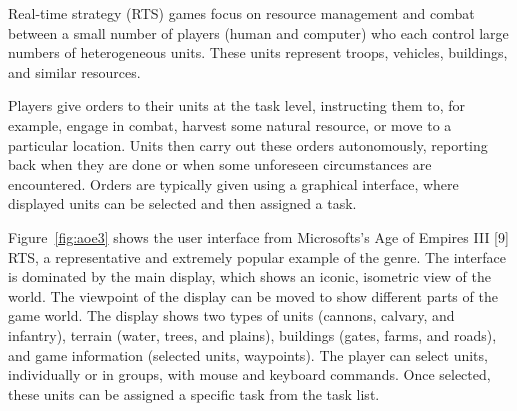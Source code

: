 
Real-time strategy (RTS) games focus on resource management and combat between a small number of players (human and computer) who each control large numbers of heterogeneous units. These units represent troops, vehicles, buildings, and similar resources.

Players give orders to their units at the task level, instructing them to, for example, engage in combat, harvest some natural resource, or move to a particular location. Units then carry out these orders autonomously, reporting back when they are done or when some unforeseen circumstances are encountered. Orders are typically given using a graphical interface, where displayed units can be selected and then assigned a task.

Figure~\ref{fig:aoe3} shows the user interface from Microsofts's Age of Empires III [9] RTS, a representative and extremely popular example of the genre. The interface is dominated by the main display, which shows an iconic, isometric view of the world. The viewpoint of the display can be moved to show different parts of the game world. The display shows two types of units (cannons, calvary, and infantry), terrain (water, trees, and plains), buildings (gates, farms, and roads), and game information (selected units, waypoints). The player can select units, individually or in groups, with mouse and keyboard commands. Once selected, these units can be assigned a specific task from the task list.

